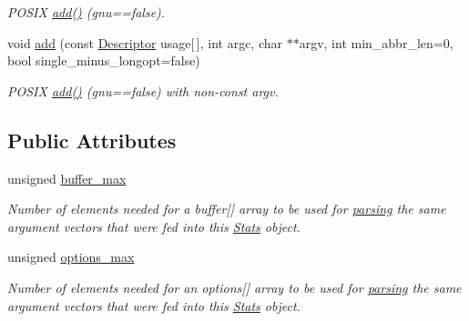 \begin{DoxyCompactItemize}
\begin{DoxyCompactList}\small\item\em \-P\-O\-S\-I\-X \hyperlink{structoption_1_1_stats_aa77e2a8b1704527d2d087820f4456143}{add()} (gnu==false). \end{DoxyCompactList}\item 
\hypertarget{structoption_1_1_stats_ad659604438f79c79f5bc009f2a16ca92}{void \hyperlink{structoption_1_1_stats_ad659604438f79c79f5bc009f2a16ca92}{add} (const \hyperlink{structoption_1_1_descriptor}{\-Descriptor} usage\mbox{[}$\,$\mbox{]}, int argc, char $\ast$$\ast$argv, int min\-\_\-abbr\-\_\-len=0, bool single\-\_\-minus\-\_\-longopt=false)}\label{structoption_1_1_stats_ad659604438f79c79f5bc009f2a16ca92}

\begin{DoxyCompactList}\small\item\em \-P\-O\-S\-I\-X \hyperlink{structoption_1_1_stats_aa77e2a8b1704527d2d087820f4456143}{add()} (gnu==false) with non-\/const argv. \end{DoxyCompactList}\end{DoxyCompactItemize}
\subsection*{\-Public \-Attributes}
\begin{DoxyCompactItemize}
\item 
unsigned \hyperlink{structoption_1_1_stats_a2c9a7b4174f91ba8bcadaa9ad6f0db06}{buffer\-\_\-max}
\begin{DoxyCompactList}\small\item\em \-Number of elements needed for a {\ttfamily buffer}\mbox{[}\mbox{]} array to be used for \hyperlink{classoption_1_1_parser_a6e0b5778d1cfbd6cd51240e74d01e138}{parsing} the same argument vectors that were fed into this \hyperlink{structoption_1_1_stats}{\-Stats} object. \end{DoxyCompactList}\item 
unsigned \hyperlink{structoption_1_1_stats_a8121787feb1c7db84fca3ccb012b0473}{options\-\_\-max}
\begin{DoxyCompactList}\small\item\em \-Number of elements needed for an {\ttfamily options}\mbox{[}\mbox{]} array to be used for \hyperlink{classoption_1_1_parser_a6e0b5778d1cfbd6cd51240e74d01e138}{parsing} the same argument vectors that were fed into this \hyperlink{structoption_1_1_stats}{\-Stats} object. \end{DoxyCompactList}\end{DoxyCompactItemize}


